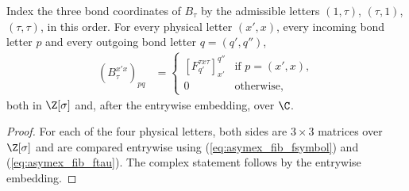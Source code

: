 \begin{lemma}
    \label{thm:asymex_fib_tau_fsymbol}
    \leanok
    Index the three bond coordinates of $B_\tau$ by the admissible
    letters $(1,\tau)$, $(\tau,1)$, $(\tau,\tau)$, in this order. For
    every physical letter $(x',x)$, every incoming bond letter $p$ and
    every outgoing bond letter $q=(q',q'')$,
    \begin{align}
        (B_\tau^{x'x})_{pq}
         & =\begin{cases}
                [F^{\tau x\tau}_{q'}]_{x'}^{q''} & \text{if } p=(x',x), \\
                0                                & \text{otherwise},
            \end{cases}
        \label{eq:asymex_fib_tau_fsymbol}
    \end{align}
    both in $\Z[\sigma]$ and, after the entrywise embedding, over $\C$.
\end{lemma}

\begin{proof}
    \leanok
    For each of the four physical letters, both sides are $3\times3$
    matrices over $\Z[\sigma]$ and are compared entrywise using
    (\ref{eq:asymex_fib_fsymbol}) and (\ref{eq:asymex_fib_ftau}). The
    complex statement follows by the entrywise embedding.
\end{proof}



